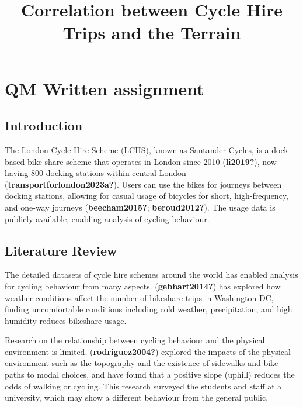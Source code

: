 \documentclass[
  letterpaper,
  DIV=11,
  numbers=noendperiod]{scrartcl}
\title{Correlation between Cycle Hire Trips and the Terrain}
\author{}
\date{}
\begin{document}
\maketitle
\ifdefined\Shaded\renewenvironment{Shaded}{\begin{tcolorbox}[borderline west={3pt}{0pt}{shadecolor}, interior hidden, enhanced, sharp corners, boxrule=0pt, frame hidden, breakable]}{\end{tcolorbox}}\fi

\hypertarget{qm-written-assignment}{%
\section{QM Written assignment}\label{qm-written-assignment}}

\hypertarget{introduction}{%
\subsection{Introduction}\label{introduction}}

The London Cycle Hire Scheme (LCHS), known as Santander Cycles, is a
dock-based bike share scheme that operates in London since 2010
(\textbf{li2019?}), now having 800 docking stations within central
London (\textbf{transportforlondon2023a?}). Users can use the bikes for
journeys between docking stations, allowing for casual usage of bicycles
for short, high-frequency, and one-way journeys (\textbf{beecham2015?};
\textbf{beroud2012?}). The usage data is publicly available, enabling
analysis of cycling behaviour.

\hypertarget{literature-review}{%
\subsection{Literature Review}\label{literature-review}}

The detailed datasets of cycle hire schemes around the world has enabled
analysis for cycling behaviour from many aspects.
(\textbf{gebhart2014?}) has explored how weather conditions affect the
number of bikeshare trips in Washington DC, finding uncomfortable
conditions including cold weather, precipitation, and high humidity
reduces bikeshare usage.

Research on the relationship between cycling behaviour and the physical
environment is limited. (\textbf{rodriguez2004?}) explored the impacts
of the physical environment such as the topography and the existence of
sidewalks and bike paths to modal choices, and have found that a
positive slope (uphill) reduces the odds of walking or cycling. This
research surveyed the students and staff at a university, which may show
a different behaviour from the general public.
\end{document}
